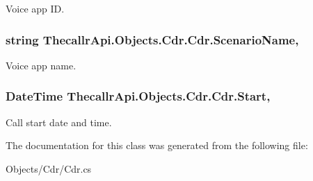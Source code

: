 Voice app I\+D. 

\hypertarget{class_thecallr_api_1_1_objects_1_1_cdr_1_1_cdr_a0d4841f02ac250c0da0a3e724b3e3aec}{
\subsubsection[{Scenario\+Name}]{\setlength{\rightskip}{0pt plus 5cm}string Thecallr\+Api.\+Objects.\+Cdr.\+Cdr.\+Scenario\+Name\hspace{0.3cm}{\ttfamily [get]}, {\ttfamily [set]}}}\label{class_thecallr_api_1_1_objects_1_1_cdr_1_1_cdr_a0d4841f02ac250c0da0a3e724b3e3aec}


Voice app name. 

\hypertarget{class_thecallr_api_1_1_objects_1_1_cdr_1_1_cdr_a6c88b0e698d2f4bb2f10a44d21bc0d4d}{
\subsubsection[{Start}]{\setlength{\rightskip}{0pt plus 5cm}Date\+Time Thecallr\+Api.\+Objects.\+Cdr.\+Cdr.\+Start\hspace{0.3cm}{\ttfamily [get]}, {\ttfamily [set]}}}\label{class_thecallr_api_1_1_objects_1_1_cdr_1_1_cdr_a6c88b0e698d2f4bb2f10a44d21bc0d4d}


Call start date and time. 



The documentation for this class was generated from the following file\+:\begin{DoxyCompactItemize}
\item 
Objects/\+Cdr/Cdr.\+cs\end{DoxyCompactItemize}
